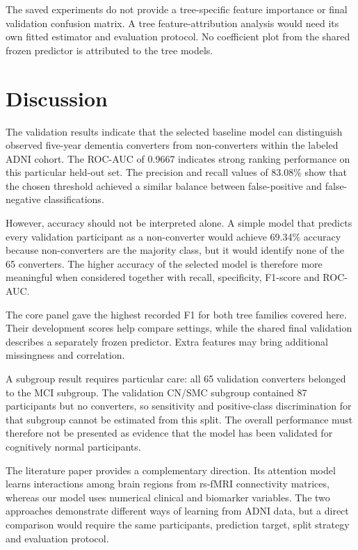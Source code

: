 \documentclass[11pt,a4paper]{article}
\begin{document}
The saved experiments do not provide a tree-specific feature importance or final validation confusion matrix. A tree feature-attribution analysis would need its own fitted estimator and evaluation protocol. No coefficient plot from the shared frozen predictor is attributed to the tree models.

\section{Discussion}
The validation results indicate that the selected baseline model can distinguish observed five-year dementia converters from non-converters within the labeled ADNI cohort. The ROC-AUC of 0.9667 indicates strong ranking performance on this particular held-out set. The precision and recall values of 83.08\% show that the chosen threshold achieved a similar balance between false-positive and false-negative classifications.

However, accuracy should not be interpreted alone. A simple model that predicts every validation participant as a non-converter would achieve 69.34\% accuracy because non-converters are the majority class, but it would identify none of the 65 converters. The higher accuracy of the selected model is therefore more meaningful when considered together with recall, specificity, F1-score and ROC-AUC.

The core panel gave the highest recorded F1 for both tree families covered here. Their development scores help compare settings, while the shared final validation describes a separately frozen predictor. Extra features may bring additional missingness and correlation.

A subgroup result requires particular care: all 65 validation converters belonged to the MCI subgroup. The validation CN/SMC subgroup contained 87 participants but no converters, so sensitivity and positive-class discrimination for that subgroup cannot be estimated from this split. The overall performance must therefore not be presented as evidence that the model has been validated for cognitively normal participants.

The literature paper provides a complementary direction. Its attention model learns interactions among brain regions from rs-fMRI connectivity matrices, whereas our model uses numerical clinical and biomarker variables. The two approaches demonstrate different ways of learning from ADNI data, but a direct comparison would require the same participants, prediction target, split strategy and evaluation protocol.
\end{document}
